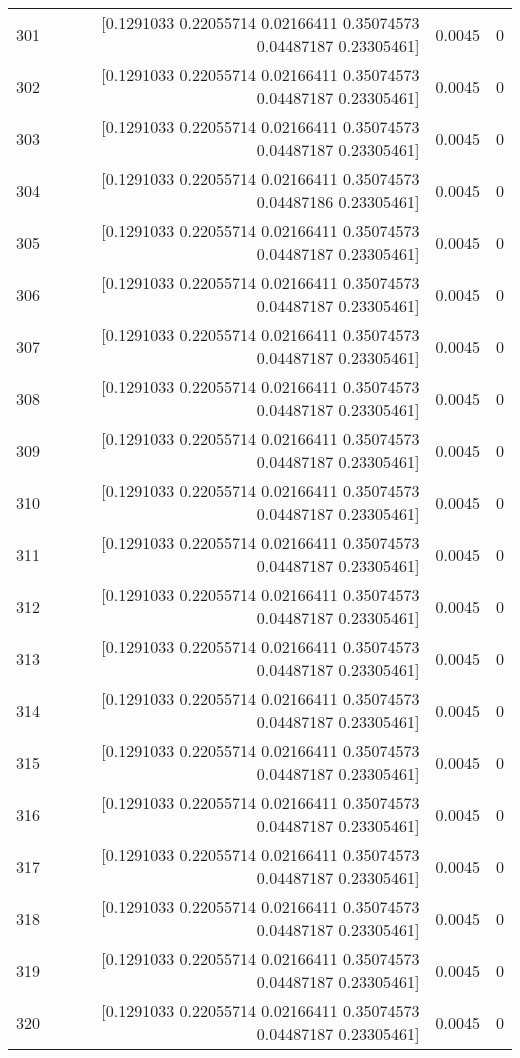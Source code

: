 \begin{longtable}{lrrr}
301 & [0.1291033  0.22055714 0.02166411 0.35074573 0.04487187 0.23305461] & 0.0045 & 0 \\
302 & [0.1291033  0.22055714 0.02166411 0.35074573 0.04487187 0.23305461] & 0.0045 & 0 \\
303 & [0.1291033  0.22055714 0.02166411 0.35074573 0.04487187 0.23305461] & 0.0045 & 0 \\
304 & [0.1291033  0.22055714 0.02166411 0.35074573 0.04487186 0.23305461] & 0.0045 & 0 \\
305 & [0.1291033  0.22055714 0.02166411 0.35074573 0.04487187 0.23305461] & 0.0045 & 0 \\
306 & [0.1291033  0.22055714 0.02166411 0.35074573 0.04487187 0.23305461] & 0.0045 & 0 \\
307 & [0.1291033  0.22055714 0.02166411 0.35074573 0.04487187 0.23305461] & 0.0045 & 0 \\
308 & [0.1291033  0.22055714 0.02166411 0.35074573 0.04487187 0.23305461] & 0.0045 & 0 \\
309 & [0.1291033  0.22055714 0.02166411 0.35074573 0.04487187 0.23305461] & 0.0045 & 0 \\
310 & [0.1291033  0.22055714 0.02166411 0.35074573 0.04487187 0.23305461] & 0.0045 & 0 \\
311 & [0.1291033  0.22055714 0.02166411 0.35074573 0.04487187 0.23305461] & 0.0045 & 0 \\
312 & [0.1291033  0.22055714 0.02166411 0.35074573 0.04487187 0.23305461] & 0.0045 & 0 \\
313 & [0.1291033  0.22055714 0.02166411 0.35074573 0.04487187 0.23305461] & 0.0045 & 0 \\
314 & [0.1291033  0.22055714 0.02166411 0.35074573 0.04487187 0.23305461] & 0.0045 & 0 \\
315 & [0.1291033  0.22055714 0.02166411 0.35074573 0.04487187 0.23305461] & 0.0045 & 0 \\
316 & [0.1291033  0.22055714 0.02166411 0.35074573 0.04487187 0.23305461] & 0.0045 & 0 \\
317 & [0.1291033  0.22055714 0.02166411 0.35074573 0.04487187 0.23305461] & 0.0045 & 0 \\
318 & [0.1291033  0.22055714 0.02166411 0.35074573 0.04487187 0.23305461] & 0.0045 & 0 \\
319 & [0.1291033  0.22055714 0.02166411 0.35074573 0.04487187 0.23305461] & 0.0045 & 0 \\
320 & [0.1291033  0.22055714 0.02166411 0.35074573 0.04487187 0.23305461] & 0.0045 & 0 \\

\end{longtable}
